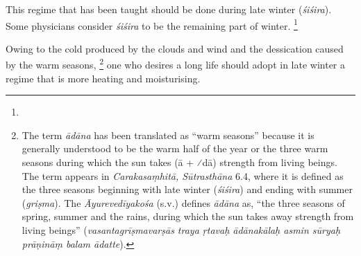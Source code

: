 \begin{translation}
\item[33] 
This regime %
that has been taught should be done during late winter (\emph{śiśira}). %
Some physicians consider \emph{śiśira} to be the remaining part of winter. 
    \footnote{ }

\item[34] %
Owing to the cold produced by the clouds and wind and the dessication %
caused by the warm seasons,%
	\footnote{The term \emph{ādāna} has been translated as ``warm seasons'' because it is generally understood to be the warm half of the year or the three warm seasons during which the sun takes (ā + ⁄{dā}) strength from living beings. The term appears in \emph{Carakasaṃhitā, Sūtrasthāna} 6.4, where it is defined as the three seasons beginning with late winter (\emph{śiśira}) and ending with summer (\emph{griṣma}). The  \emph{Āyurevedīyakośa} (s.v.) defines \emph{ādāna} as, ``the three seasons of spring, summer and the rains, during which the sun takes away strength from living beings''  (\emph{vasantagrīṣmavarṣās traya ṛtavaḥ ādānakālaḥ asmin sūryaḥ prāṇināṃ balam ādatte}).}
one who desires a long life should adopt in late winter %
a regime that is more heating and moisturising. %


\end{translation}

